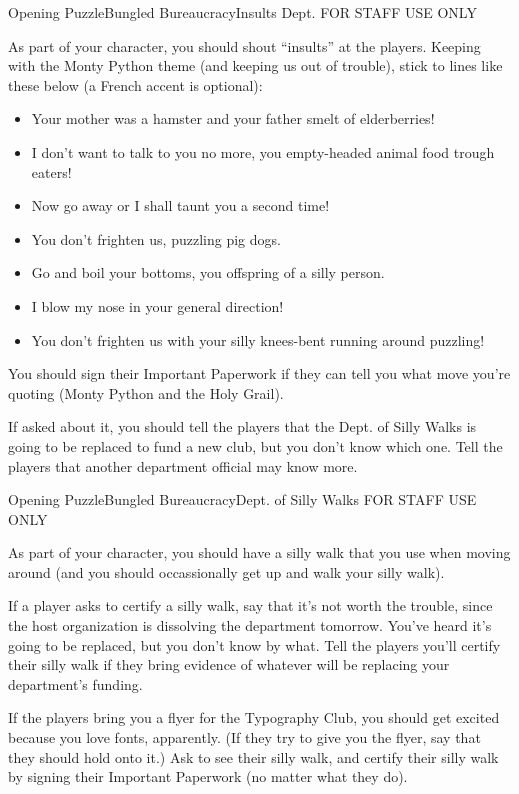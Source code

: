 \begin{customPuzzle}{Opening Puzzle}{Bungled Bureaucracy}{Insults Dept.}
  FOR STAFF USE ONLY

  As part of your character, you should shout ``insults'' at the players.
  Keeping with the Monty Python theme (and keeping us out of trouble),
  stick to lines like these below (a French accent is optional):

  \begin{itemize}
  \item Your mother was a hamster and your father smelt of elderberries!
  \item I don't want to talk to you no more, you empty-headed animal food
    trough eaters!
  \item Now go away or I shall taunt you a second time!
  \item You don't frighten us, puzzling pig dogs.
  \item Go and boil your bottoms, you offspring of a silly person.
  \item I blow my nose in your general direction!
  \item You don't frighten us with your silly knees-bent running
    around puzzling!
  \end{itemize}

  You should sign their Important Paperwork if they can tell you what
  move you're quoting (Monty Python and the Holy Grail).

  If asked about it, you should tell the players
  that the Dept. of Silly Walks is going to be
  replaced to fund a new club, but you don't know which one. Tell the players
  that another department official may know more.
\end{customPuzzle}

\begin{customPuzzle}{Opening Puzzle}{Bungled Bureaucracy}{Dept. of Silly Walks}
  FOR STAFF USE ONLY

  As part of your character, you should have a silly walk that you use when
  moving around (and you should occassionally get up and walk your silly
  walk).

  If a player asks to certify a silly walk, say that it's not worth the trouble,
  since the host organization is dissolving the department tomorrow. You've
  heard it's going to be replaced, but you don't know by what. Tell the
  players you'll certify their silly walk if they bring evidence of whatever
  will be replacing your department's funding.

  If the players bring you a flyer for the Typography Club, you should
  get excited because you love fonts, apparently. (If they try to give you
  the flyer, say that they should hold onto it.) Ask to see their silly
  walk, and certify their silly walk by signing their Important Paperwork
  (no matter what they do).
\end{customPuzzle}
